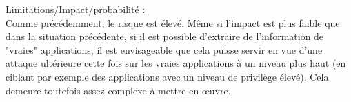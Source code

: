 \underline{Limitations/Impact/probabilité :}\\
Comme précédemment, le risque est élevé. Même si l’impact est plus faible que dans la situation précédente, si il est possible d’extraire de l’information de "vraies" applications, il est envisageable que cela puisse servir en vue d’une attaque ultérieure cette fois sur les vraies applications à un niveau plus haut (en ciblant par exemple des applications avec un niveau de privilège élevé). Cela demeure toutefois assez complexe à mettre en œuvre.
